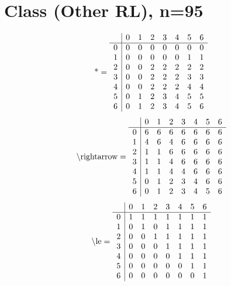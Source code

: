 \documentclass[11pt]{article}
\begin{document}
\section{Class (Other RL), n=95}
\[\text{*} = 
\begin{array}{r | r r r r r r r}
 & 0 & 1 & 2 & 3 & 4 & 5 & 6 \\ \hline
0 & 0 & 0 & 0 & 0 & 0 & 0 & 0 \\
1 & 0 & 0 & 0 & 0 & 0 & 1 & 1 \\
2 & 0 & 0 & 2 & 2 & 2 & 2 & 2 \\
3 & 0 & 0 & 2 & 2 & 2 & 3 & 3 \\
4 & 0 & 0 & 2 & 2 & 2 & 4 & 4 \\
5 & 0 & 1 & 2 & 3 & 4 & 5 & 5 \\
6 & 0 & 1 & 2 & 3 & 4 & 5 & 6 \\
\end{array}
\]
\[\text{\textbackslash rightarrow} = 
\begin{array}{r | r r r r r r r}
 & 0 & 1 & 2 & 3 & 4 & 5 & 6 \\ \hline
0 & 6 & 6 & 6 & 6 & 6 & 6 & 6 \\
1 & 4 & 6 & 4 & 6 & 6 & 6 & 6 \\
2 & 1 & 1 & 6 & 6 & 6 & 6 & 6 \\
3 & 1 & 1 & 4 & 6 & 6 & 6 & 6 \\
4 & 1 & 1 & 4 & 4 & 6 & 6 & 6 \\
5 & 0 & 1 & 2 & 3 & 4 & 6 & 6 \\
6 & 0 & 1 & 2 & 3 & 4 & 5 & 6 \\
\end{array}
\]
\[\text{\textbackslash le} = 
\begin{array}{r | r r r r r r r}
 & 0 & 1 & 2 & 3 & 4 & 5 & 6 \\ \hline
0 & 1 & 1 & 1 & 1 & 1 & 1 & 1 \\
1 & 0 & 1 & 0 & 1 & 1 & 1 & 1 \\
2 & 0 & 0 & 1 & 1 & 1 & 1 & 1 \\
3 & 0 & 0 & 0 & 1 & 1 & 1 & 1 \\
4 & 0 & 0 & 0 & 0 & 1 & 1 & 1 \\
5 & 0 & 0 & 0 & 0 & 0 & 1 & 1 \\
6 & 0 & 0 & 0 & 0 & 0 & 0 & 1 \\
\end{array}
\]
\end{document}
